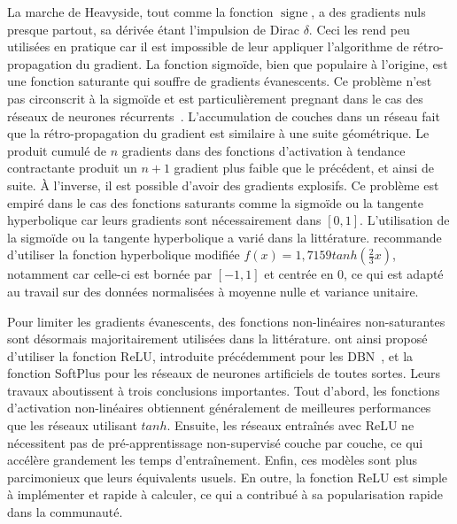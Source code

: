 La marche de Heavyside, tout comme la fonction $\operatorname{signe}$, a des gradients nuls presque partout, sa dérivée étant l'impulsion de Dirac $\delta$. Ceci les rend peu utilisées en pratique car il est impossible de leur appliquer l'algorithme de rétro-propagation du gradient.
La fonction sigmoïde, bien que populaire à l'origine, est une fonction saturante qui souffre de gradients évanescents. Ce problème n'est pas circonscrit à la sigmoïde et est particulièrement pregnant dans le cas des réseaux de neurones récurrents~\cite{hochreiter_gradient_2001}. L'accumulation de couches dans un réseau fait que la rétro-propagation du gradient est similaire à une suite géométrique. Le produit cumulé de $n$ gradients dans des fonctions d'activation à tendance contractante produit un $n+1$ gradient plus faible que le précédent, et ainsi de suite. À l'inverse, il est possible d'avoir des gradients explosifs. Ce problème est empiré dans le cas des fonctions saturants comme la sigmoïde ou la tangente hyperbolique car leurs gradients sont nécessairement dans $[0,1]$. L'utilisation de la sigmoïde ou la tangente hyperbolique a varié dans la littérature. \citet{lecun_efficient_1998} recommande d'utiliser la fonction hyperbolique modifiée $f(x) = 1,7159 tanh(\frac{2}{3} x)$, notamment car celle-ci est bornée par $[-1,1]$ et centrée en 0, ce qui est adapté au travail sur des données normalisées à moyenne nulle et variance unitaire.

Pour limiter les gradients évanescents, des fonctions non-linéaires non-saturantes sont désormais majoritairement utilisées dans la littérature. \citet{glorot_deep_2011} ont ainsi proposé d'utiliser la fonction \gls{ReLU}, introduite précédemment pour les \gls{DBN}~\cite{nair_rectified_2010}, et la fonction SoftPlus pour les réseaux de neurones artificiels de toutes sortes. Leurs travaux aboutissent à trois conclusions importantes. Tout d'abord, les fonctions d'activation non-linéaires obtiennent généralement de meilleures performances que les réseaux utilisant $tanh$. Ensuite, les réseaux entraînés avec \gls{ReLU} ne nécessitent pas de pré-apprentissage non-supervisé couche par couche, ce qui accélère grandement les temps d'entraînement. Enfin, ces modèles sont plus parcimonieux que leurs équivalents usuels. En outre, la fonction \gls{ReLU} est simple à implémenter et rapide à calculer, ce qui a contribué à sa popularisation rapide dans la communauté.

